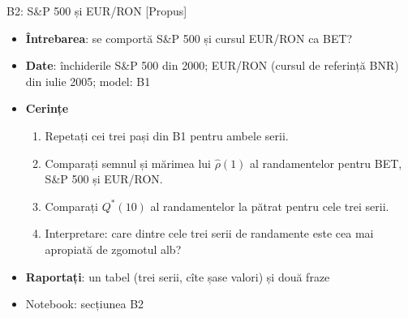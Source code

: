 \begin{frame}{B2: S\&P 500 și EUR/RON [Propus]}
\itemsize{\footnotesize}
\begin{itemize}
\item \textbf{Întrebarea}: se comportă S\&P 500 și cursul EUR/RON ca BET?
\item \textbf{Date}: închiderile S\&P 500 din 2000; EUR/RON (cursul de referință BNR) din iulie 2005; model: B1
\item \textbf{Cerințe}
\begin{enumerate}
    \item Repetați cei trei pași din B1 pentru ambele serii.
    \item Comparați semnul și mărimea lui $\hat\rho(1)$ al randamentelor pentru BET, S\&P 500 și EUR/RON.
    \item Comparați $Q^*(10)$ al randamentelor la pătrat pentru cele trei serii.
    \item Interpretare: care dintre cele trei serii de randamente este cea mai apropiată de zgomotul alb?
\end{enumerate}
\item \textbf{Raportați}: un tabel (trei serii, cîte șase valori) și două fraze
\item Notebook: secțiunea B2
\end{itemize}
\end{frame}

